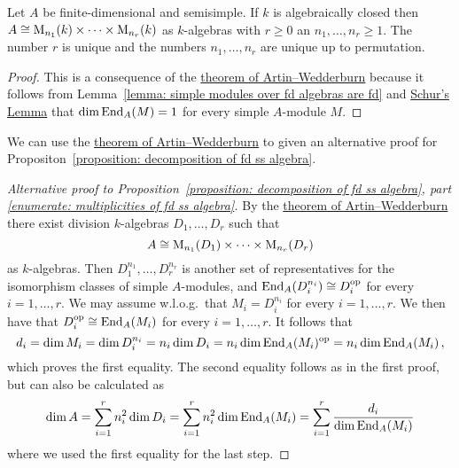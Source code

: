 \begin{corollary}
  \label{corollary: semisimple algebra product of matrix algebras}
  Let $A$ be finite-dimensional and semisimple.
  If $k$ is algebraically closed then $A \cong \operatorname{M}_{n_1}(k) \times \dotsm \times \operatorname{M}_{n_r}(k)$ as $k$-algebras with $r \geq 0$ an $n_1, \dotsc, n_r \geq 1$.
  The number $r$ is unique and the numbers $n_1, \dotsc, n_r$ are unique up to permutation.
\end{corollary}


\begin{proof}
  This is a consequence of the \hyperref[theorem: artin wedderburn theorem]{theorem of Artin--Wedderburn} because it follows from Lemma~\ref{lemma: simple modules over fd algebras are fd} and \hyperref[proposition: schurs lemma for modules]{Schur’s Lemma} that $\dim \operatorname{End}_A(M) = 1$ for every simple $A$-module $M$.
\end{proof}


\begin{fluff}
  We can use the \hyperref[theorem: artin wedderburn theorem]{theorem of Artin--Wedderburn} to given an alternative proof for Propositon~\ref{proposition: decomposition of fd ss algebra}.
\end{fluff}


\begin{proof}[Alternative proof to Proposition~\ref*{proposition: decomposition of fd ss algebra}, part \ref*{enumerate: multiplicities of fd ss algebra}]
  By the \hyperref[theorem: artin wedderburn theorem]{theorem of Artin--Wedderburn} there exist division $k$-algebras $D_1, \dotsc, D_r$ such that
  \[
          A
    \cong \operatorname{M}_{n_1}(D_1) \times \dotsb \times \operatorname{M}_{n_r}(D_r)
  \]
  as $k$-algebras.
  Then $D_1^{n_1}, \dotsc, D_r^{n_r}$ is another set of representatives for the isomorphism classes of simple $A$-modules, and $\operatorname{End}_A(D_i^{n_i}) \cong D_i^{\operatorname{op}}$ for every $i = 1, \dotsc, r$.
  We may assume w.l.o.g.\ that $M_i = D_i^{n_i}$ for every $i = 1, \dotsc, r$.
  We then have that $D_i^{\operatorname{op}} \cong \operatorname{End}_A(M_i)$ for every $i = 1, \dotsc, r$.
  It follows that
  \[
      d_i
    = \dim M_i
    = \dim D_i^{n_i}
    = n_i \dim D_i
    = n_i \dim \operatorname{End}_A(M_i)^{\operatorname{op}}
    = n_i \dim \operatorname{End}_A(M_i) \,,
  \]
  which proves the first equality.
  The second equality follows as in the first proof, but can also be calculated as
  \[
      \dim A
    = \sum_{i=1}^r n_i^2 \dim D_i
    = \sum_{i=1}^r n_i^2 \dim \operatorname{End}_A(M_i)
    = \sum_{i=1}^r \frac{d_i}{\dim \operatorname{End}_A(M_i)}
  \]
  where we used the first equality for the last step.
\end{proof}


